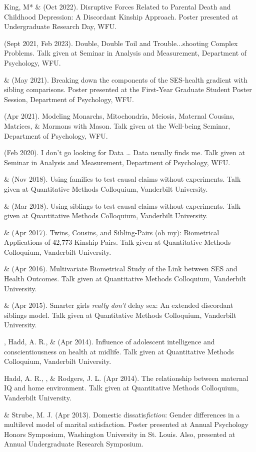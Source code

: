 \begin{etaremune}

\item King, M* \& \meb (Oct 2022). Disruptive Forces Related to Parental Death and Childhood Depression: A Discordant Kinship Approach. Poster presented at Undergraduate Research Day, WFU.

\item \meb (Sept 2021, Feb 2023). Double, Double Toil and Trouble...shooting Complex Problems. Talk given at Seminar in Analysis and Measurement, Department of Psychology, WFU. 
%
\item \yrh \& \meb (May 2021). Breaking down the components of the SES-health gradient with sibling comparisons. Poster presented at the First-Year Graduate Student Poster Session, Department of Psychology, WFU.
%
\item\meb (Apr 2021). Modeling Monarchs, Mitochondria, Meiosis, Maternal Cousins, Matrices, \& Mormons with Mason. Talk given at the Well-being Seminar, Department of Psychology, WFU. 
%
\item\meb (Feb 2020). I don't go looking for Data … Data usually finds me. Talk given at Seminar in Analysis and Measurement, Department of Psychology, WFU. 
%
\item\meb \& \Joe (Nov 2018). Using families to test causal claims without experiments. Talk given at Quantitative Methods Colloquium, Vanderbilt University. 
%
\item\meb \& \Joe (Mar 2018). Using siblings to test causal claims without experiments. Talk given at Quantitative Methods Colloquium, Vanderbilt University.
%
\item\meb \& \Joe (Apr 2017). Twins, Cousins, and Sibling-Pairs (oh my): Biometrical Applications of 42,773 Kinship Pairs. Talk given at Quantitative Methods Colloquium, Vanderbilt University. %
%
\item\meb \& \Joe (Apr 2016). Multivariate Biometrical Study of the Link between SES and Health Outcomes. Talk given at Quantitative Methods Colloquium, Vanderbilt University.
%
\item\meb \& \Joe (Apr 2015). Smarter girls \textit{really don't} delay sex: An extended discordant siblings model. Talk given at Quantitative Methods Colloquium, Vanderbilt University.
\item\meb, Hadd, A. R., \& \Joe (Apr 2014). Influence of adolescent intelligence and conscientiousness on health at midlife. Talk given at Quantitative Methods Colloquium, Vanderbilt University. 
%
\item Hadd, A. R., \meb, \& Rodgers, J. L. (Apr 2014). The relationship between maternal IQ and home environment. Talk given at Quantitative Methods Colloquium, Vanderbilt University.
%
\item\meb \& Strube, M. J. (Apr 2013). Domestic dissatis{\em fiction}: Gender differences in a multilevel model of marital satisfaction. Poster presented at Annual Psychology Honors Symposium, Washington University in St. Louis. Also, presented at Annual Undergraduate Research Symposium.
\end{etaremune}
